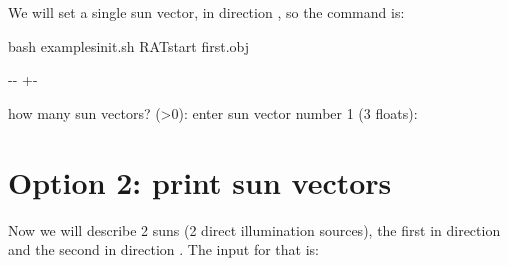 \documentclass[letterpaper,10pt,english]{sphinxmanual}
\newlength\nbsphinxcodecellspacing
\begin{document}
We will set a single sun vector, in direction , so the command is:

\begin{sphinxVerbatim}[commandchars=\\\{\}]
    
\end{sphinxVerbatim}

{
\begin{sphinxVerbatim}[commandchars=\\\{\}]
\llap{\color{nbsphinxin}[4]:\,\hspace{\fboxrule}\hspace{\fboxsep}}\PYGZpc{}\PYGZpc{}bash
 examples\PYGZus{}init.sh
RATstart first.obj 
\end{sphinxVerbatim}
}

{

\kern-\sphinxverbatimsmallskipamount\kern-\baselineskip
\kern+\FrameHeightAdjust\kern-\fboxrule
\vspace{\nbsphinxcodecellspacing}

\begin{sphinxVerbatim}[commandchars=\\\{\}]
how many sun vectors? (>0): enter sun vector number 1 (3 floats):
\end{sphinxVerbatim}
}


\section{Option 2: print sun vectors}
\label{\detokenize{RATstartOptions:Option-2:-print-sun-vectors}}
\begin{sphinxVerbatim}[commandchars=\\\{\}]
                      
\end{sphinxVerbatim}

Now we will describe 2 suns (2 direct illumination sources), the first in direction  and the second in direction . The input for that is:
\end{document}
